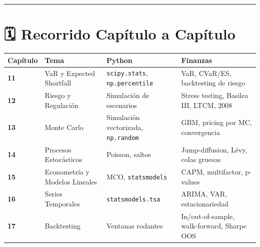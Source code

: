 \documentclass[
  spanish,
  letterpaper,
  DIV=11,
  numbers=noendperiod]{scrreprt}
\begin{document}
\begin{center}\rule{0.5\linewidth}{0.5pt}\end{center}

\section*{🗓️ Recorrido Capítulo a
Capítulo}\label{recorrido-capuxedtulo-a-capuxedtulo-2}


\begin{longtable}[]{@{}
  >{\centering\arraybackslash}p{}
  >{\raggedright\arraybackslash}p{}
  >{\raggedright\arraybackslash}p{}
  >{\raggedright\arraybackslash}p{}@{}}
\toprule\noalign{}
\begin{minipage}[b]{\linewidth}\centering
Capítulo
\end{minipage} & \begin{minipage}[b]{\linewidth}\raggedright
Tema
\end{minipage} & \begin{minipage}[b]{\linewidth}\raggedright
Python
\end{minipage} & \begin{minipage}[b]{\linewidth}\raggedright
Finanzas
\end{minipage} \\
\midrule\noalign{}
\endhead
\bottomrule\noalign{}
\endlastfoot
\textbf{11} & VaR y Expected Shortfall & \texttt{scipy.stats},
\texttt{np.percentile} & VaR, CVaR/ES, backtesting de riesgo \\
\textbf{12} & Riesgo y Regulación & Simulación de escenarios & Stress
testing, Basilea III, LTCM, 2008 \\
\textbf{13} & Monte Carlo & Simulación vectorizada, \texttt{np.random} &
GBM, pricing por MC, convergencia \\
\textbf{14} & Procesos Estocásticos & Poisson, saltos & Jump-diffusion,
Lévy, colas gruesas \\
\textbf{15} & Econometría y Modelos Lineales & MCO, \texttt{statsmodels}
& CAPM, multifactor, p-values \\
\textbf{16} & Series Temporales & \texttt{statsmodels.tsa} & ARIMA, VAR,
estacionariedad \\
\textbf{17} & Backtesting & Ventanas rodantes & In/out-of-sample,
walk-forward, Sharpe OOS \\
\end{longtable}
\end{document}
